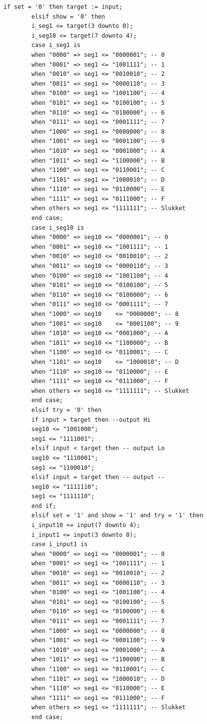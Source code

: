 \begin{enumerate}
\begin{lstlisting}[caption={Behavioral style kode for Guessgame},label={lst:Guessgame}]
		if set = '0' then target := input;
		elsif show = '0' then 
		i_seg1 <= target(3 downto 0);
		i_seg10 <= target(7 downto 4);
		case i_seg1 is
		when "0000" => seg1 <= "0000001"; -- 0
		when "0001" => seg1 <= "1001111"; -- 1
		when "0010" => seg1 <= "0010010"; -- 2
		when "0011" => seg1 <= "0000110"; -- 3
		when "0100" => seg1 <= "1001100"; -- 4
		when "0101" => seg1 <= "0100100"; -- 5
		when "0110" => seg1 <= "0100000"; -- 6
		when "0111" => seg1 <= "0001111"; -- 7
		when "1000" => seg1 <= "0000000"; -- 8
		when "1001" => seg1 <= "0001100"; -- 9
		when "1010" => seg1 <= "0001000"; -- A
		when "1011" => seg1 <= "1100000"; -- B
		when "1100" => seg1 <= "0110001"; -- C
		when "1101" => seg1 <= "1000010"; -- D
		when "1110" => seg1 <= "0110000"; -- E
		when "1111" => seg1 <= "0111000"; -- F
		when others => seg1 <= "1111111"; -- Slukket
		end case;
		case i_seg10 is
		when "0000" => seg10 <= "0000001"; -- 0
		when "0001" => seg10 <= "1001111"; -- 1
		when "0010" => seg10 <= "0010010"; -- 2
		when "0011" => seg10 <= "0000110"; -- 3
		when "0100" => seg10 <= "1001100"; -- 4
		when "0101" => seg10 <= "0100100"; -- 5
		when "0110" => seg10 <= "0100000"; -- 6
		when "0111" => seg10 <= "0001111"; -- 7
		when "1000" => seg10	<= "0000000"; -- 8
		when "1001" => seg10	<= "0001100"; -- 9
		when "1010" => seg10 <= "0001000"; -- A
		when "1011" => seg10 <= "1100000"; -- B
		when "1100" => seg10 <= "0110001"; -- C
		when "1101" => seg10	<= "1000010"; -- D
		when "1110" => seg10 <= "0110000"; -- E
		when "1111" => seg10 <= "0111000"; -- F
		when others => seg10 <= "1111111"; -- Slukket
		end case;
		elsif try = '0' then 
		if input > target then --output Hi
		seg10 <= "1001000"; 
		seg1 <= "1111001";
		elsif input < target then -- output Lo
		seg10 <= "1110001"; 
		seg1 <= "1100010";
		elsif input = target then -- output --
		seg10 <= "1111110"; 
		seg1 <= "1111110";
		end if;
		elsif set = '1' and show = '1' and try = '1' then 
		i_input10 <= input(7 downto 4); 
		i_input1 <= input(3 downto 0);
		case i_input1 is
		when "0000" => seg1 <= "0000001"; -- 0
		when "0001" => seg1 <= "1001111"; -- 1
		when "0010" => seg1 <= "0010010"; -- 2
		when "0011" => seg1 <= "0000110"; -- 3
		when "0100" => seg1 <= "1001100"; -- 4
		when "0101" => seg1 <= "0100100"; -- 5
		when "0110" => seg1 <= "0100000"; -- 6
		when "0111" => seg1 <= "0001111"; -- 7
		when "1000" => seg1 <= "0000000"; -- 8
		when "1001" => seg1 <= "0001100"; -- 9
		when "1010" => seg1 <= "0001000"; -- A
		when "1011" => seg1 <= "1100000"; -- B
		when "1100" => seg1 <= "0110001"; -- C
		when "1101" => seg1 <= "1000010"; -- D
		when "1110" => seg1 <= "0110000"; -- E
		when "1111" => seg1 <= "0111000"; -- F
		when others => seg1 <= "1111111"; -- Slukket
		end case;
		

\end{lstlisting}
\end{enumerate}
